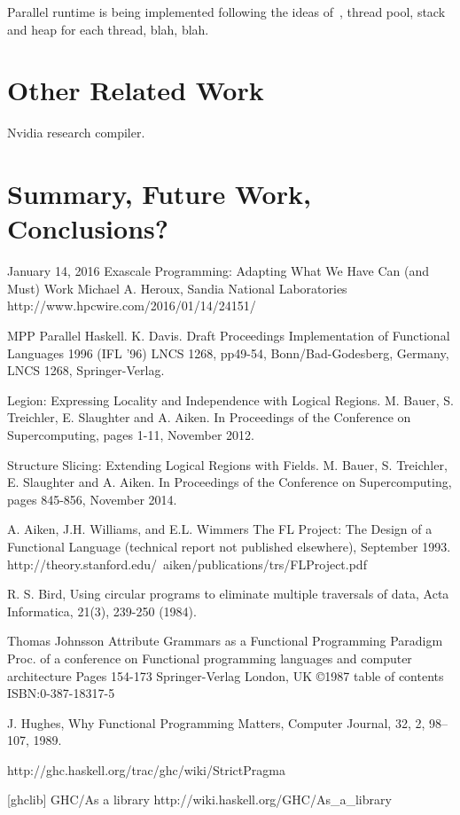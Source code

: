 \documentclass{llncs}
\begin{document}
Parallel runtime is being implemented following the ideas of~\cite{SPJs-many-papers}, thread pool,
stack and heap for each thread, blah, blah.

\section{Other Related Work}
Nvidia research compiler.

\section{Summary, Future Work, Conclusions?}


%
%
\begin{thebibliography}{5}

January 14, 2016
Exascale Programming: Adapting What We Have Can (and Must) Work
Michael A. Heroux, Sandia National Laboratories
http://www.hpcwire.com/2016/01/14/24151/


MPP Parallel Haskell. 
K. Davis. 
Draft Proceedings Implementation of Functional Languages 1996 (IFL '96) LNCS
1268, pp49-54, Bonn/Bad-Godesberg, Germany, LNCS 1268, Springer-Verlag.

Legion: Expressing Locality and Independence with Logical
  Regions. M. Bauer, S. Treichler, E. Slaughter and A. Aiken. In Proceedings
  of the Conference on Supercomputing, pages 1-11, November 2012.

Structure Slicing: Extending Logical Regions with Fields. M. Bauer, S. Treichler, E. Slaughter and A. Aiken. In Proceedings of the Conference on Supercomputing, pages 845-856, November 2014.

A. Aiken, J.H. Williams, and E.L. Wimmers
The FL Project:  The Design of a Functional Language
(technical report not published elsewhere), September 1993.
http://theory.stanford.edu/~aiken/publications/trs/FLProject.pdf

R. S. Bird, 
Using circular programs to eliminate multiple traversals of data, 
Acta Informatica, 21(3), 239-250 (1984).

Thomas Johnsson
Attribute Grammars as a Functional Programming Paradigm
Proc. of a conference on Functional programming languages and computer architecture
Pages 154-173 
Springer-Verlag London, UK ©1987 
table of contents ISBN:0-387-18317-5

J. Hughes,
Why Functional Programming Matters,
Computer Journal,
32,
2,
98--107,
1989.

http://ghc.haskell.org/trac/ghc/wiki/StrictPragma

[ghclib] GHC/As a library http://wiki.haskell.org/GHC/As\_a\_library

\end{thebibliography}
\end{document}
